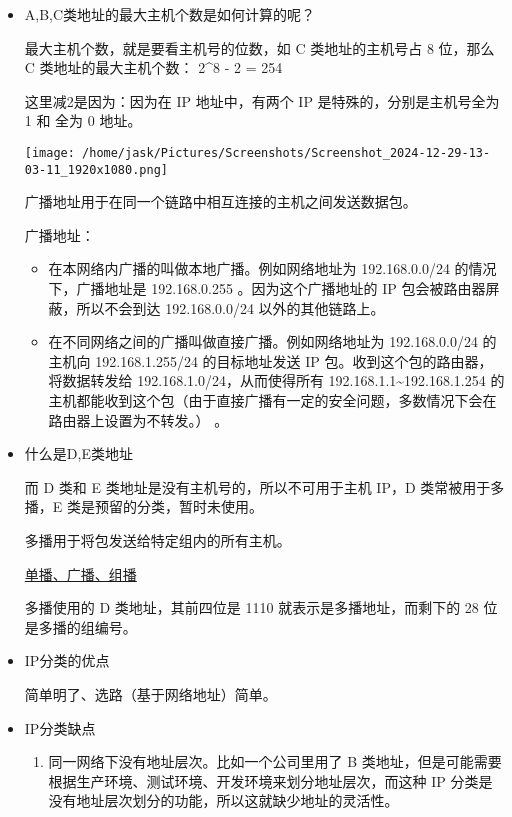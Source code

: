 \documentclass[11pt]{article}
\begin{document}
\begin{itemize}
\item A,B,C类地址的最大主机个数是如何计算的呢？

最大主机个数，就是要看主机号的位数，如 C 类地址的主机号占 8 位，那么 C 类地址的最大主机个数：
2\^{}8 - 2 = 254

这里减2是因为：因为在 IP 地址中，有两个 IP 是特殊的，分别是主机号全为 1 和 全为 0 地址。

\begin{center}
\texttt{[image: /home/jask/Pictures/Screenshots/Screenshot\_2024-12-29-13-03-11\_1920x1080.png]}
\end{center}

广播地址用于在同一个链路中相互连接的主机之间发送数据包。

广播地址：
\begin{itemize}
\item 在本网络内广播的叫做本地广播。例如网络地址为 192.168.0.0/24 的情况下，广播地址是 192.168.0.255 。因为这个广播地址的 IP 包会被路由器屏蔽，所以不会到达 192.168.0.0/24 以外的其他链路上。

\item 在不同网络之间的广播叫做直接广播。例如网络地址为 192.168.0.0/24 的主机向 192.168.1.255/24 的目标地址发送 IP 包。收到这个包的路由器，将数据转发给 192.168.1.0/24，从而使得所有 192.168.1.1\textasciitilde{}192.168.1.254 的主机都能收到这个包（由于直接广播有一定的安全问题，多数情况下会在路由器上设置为不转发。） 。
\end{itemize}

\item 什么是D,E类地址

而 D 类和 E 类地址是没有主机号的，所以不可用于主机 IP，D 类常被用于多播，E 类是预留的分类，暂时未使用。

多播用于将包发送给特定组内的所有主机。

\href{file:///home/jask/Pictures/Screenshots/Screenshot\_2024-12-29-13-06-33\_1920x1080.png}{单播、广播、组播}

多播使用的 D 类地址，其前四位是 1110 就表示是多播地址，而剩下的 28 位是多播的组编号。

\item IP分类的优点

简单明了、选路（基于网络地址）简单。

\item IP分类缺点

\begin{enumerate}
\item 同一网络下没有地址层次。比如一个公司里用了 B 类地址，但是可能需要根据生产环境、测试环境、开发环境来划分地址层次，而这种 IP 分类是没有地址层次划分的功能，所以这就缺少地址的灵活性。


\end{enumerate}
\end{itemize}
\end{document}
